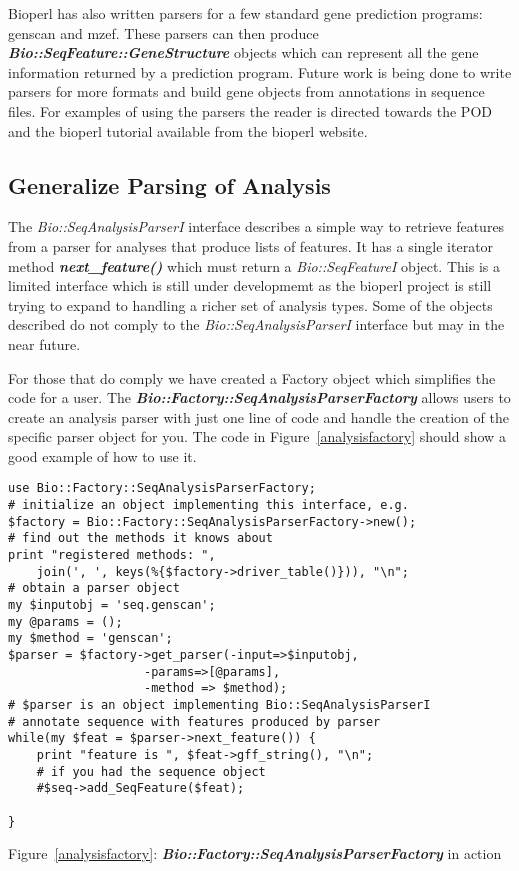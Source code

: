\documentclass{article}
\begin{document}
Bioperl has also written parsers for a few standard gene prediction
programs: genscan and mzef.  These parsers can then produce \emph{\bf
Bio::SeqFeature::GeneStructure} objects which can represent all the
gene information returned by a prediction program.  Future work is
being done to write parsers for more formats and build gene objects
from annotations in sequence files.  For examples of using the parsers
the reader is directed towards the POD and the bioperl tutorial
available from the bioperl website.

\subsection{Generalize Parsing of Analysis}

The \emph{Bio::SeqAnalysisParserI} interface describes a simple way to
retrieve features from a parser for analyses that produce lists of
features.  It has a single iterator method {\it \bf next\_feature()}
which must return a \emph{Bio::SeqFeatureI} object.  This is a limited
interface which is still under developmemt as the bioperl project is
still trying to expand to handling a richer set of analysis types.
Some of the objects described do not comply to the
\emph{Bio::SeqAnalysisParserI} interface but may in the near future.
\par For those that do comply we have created a Factory object which
simplifies the code for a user.  The \emph{\bf
Bio::Factory::SeqAnalysisParserFactory} allows users to create an
analysis parser with just one line of code and handle the creation
of the specific parser object for you.  The code in
Figure~\ref{analysisfactory} should show a good example of how to use
it. 

\begin{verbatim}
use Bio::Factory::SeqAnalysisParserFactory;
# initialize an object implementing this interface, e.g.
$factory = Bio::Factory::SeqAnalysisParserFactory->new();
# find out the methods it knows about
print "registered methods: ",
    join(', ', keys(%{$factory->driver_table()})), "\n";
# obtain a parser object
my $inputobj = 'seq.genscan';
my @params = ();
my $method = 'genscan';
$parser = $factory->get_parser(-input=>$inputobj,
			       -params=>[@params],
			       -method => $method);
# $parser is an object implementing Bio::SeqAnalysisParserI
# annotate sequence with features produced by parser
while(my $feat = $parser->next_feature()) {
    print "feature is ", $feat->gff_string(), "\n";
    # if you had the sequence object
    #$seq->add_SeqFeature($feat);
    
}
\end{verbatim}
\label{analysisfactory}
\centerline{Figure~\ref{analysisfactory}:
\emph{\bf Bio::Factory::SeqAnalysisParserFactory} in action}
\end{document}
